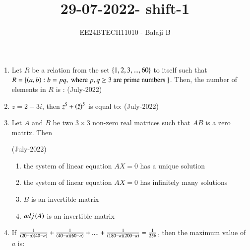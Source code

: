 \documentclass[journal]{IEEEtran}
\begin{document}

\vspace{3cm}

\title{29-07-2022- shift-1}
\author{EE24BTECH11010 - Balaji B}
{\let\newpage\relax\maketitle}
\begin{enumerate}
    \item Let $R$ be a relation from the set $\left\{1,2,3,...,60\right\}$
 to itself such that $R = \left\{\left(a,b\right) : b = pq, \text{ where } p, q \ge 3 \text{ are prime numbers }\right\}$. Then, the  number of elements in $R$ is : \hfill (July-2022)
 \begin{enumerate}
 \end{enumerate}
 \item $z = 2 + 3i$, then $z^5 + \left(\bar{z}\right)^5$ is equal to: \hfill (July-2022)
 \begin{enumerate}
 \end{enumerate}
 \item Let $A$ and $B$ be two $3 \times 3$
 non-zero real matrices such that $AB$ is a zero matrix. Then

 \hfill(July-2022)
 \begin{enumerate}
     
         \item the system of linear equation $AX = 0$ has a unique solution
         \item the system of linear equation $AX = 0$ has infinitely many solutions
         \item $B$ is an invertible matrix
         \item $adj \left(A\right)$ is an invertible matrix 
 \end{enumerate}
 \item If $\frac{1}{\left(20-a\right)\left(40-a\right)} + \frac{1}{\left(40-a\right)\left(60-a\right)} + . . . . + \frac{1}{\left(180-a\right)\left(200-a\right)} = \frac{1}{256}$, then the maximum value of $a$ is:


\end{enumerate}
\end{document}
